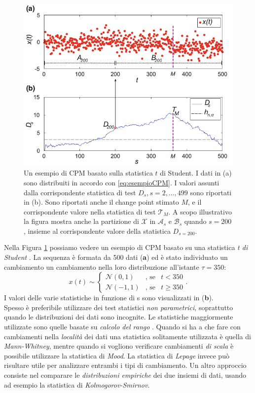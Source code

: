 \begin{figure}[tb]
	\centering
	\includegraphics[width=12cm,keepaspectratio]{pictures/CPM}
	\caption[Esempio di CPM]{Un esempio di CPM basato sulla statistica $t$ di Student. I dati in (a) sono distribuiti in accordo con \eqref{eq:esempioCPM}. I valori assunti dalla corrispondente statistica di test ${D_s,s=2,\dots,499}$ sono riportati in (b). Sono riportati anche il change point stimato $M$, e il corrispondente valore nella statistica di test $\mathcal{T}_M$. A scopo illustrativo la figura mostra anche  la partizione di $\mathcal{X}$ in $\mathcal{A}_s$ e $\mathcal{B}_s$ quando $s=200$, insieme al corrispondente valore della statistica $D_{s=200}$.}
	\label{fig:CPM}
\end{figure}
Nella Figura \ref{fig:CPM} possiamo vedere un esempio di CPM basato su una statistica \textit{t di Student} \cite{alippi2014intelligence}. La sequenza \`e formata da 500 dati (\textbf{a}) ed \`e stato individuato un cambiamento un cambiamento nella loro distribuzione all'istante $\tau=350$:
\begin{equation}
	\label{eq:esempioCPM}
	x(t)\sim \left\{ \begin{array} {lcl}
	\mathcal{N}(0,1) & \mbox{, se} & t< 350 \\
	\mathcal{N}(-1,1) & \mbox{, se} & t\geq 350 \end{array} \right. .
\end{equation} 
I valori delle varie statistiche in funzione di s sono visualizzati in (\textbf{b}).\\
Spesso \`e preferibile utilizzare dei test
statistici \textit{non parametrici},
soprattutto quando le distribuzioni dei dati
sono incognite. Le statistiche maggiormente
utilizzate sono quelle basate su
\textit{calcolo del rango}
\cite{ross2011nonparametric}. Quando si ha a
che fare con cambiamenti nella
\textit{localit\`a} dei dati una statistica
solitamente utilizzata \`e quella di
\textit{Mann-Whitney}, mentre quando si
vogliono verificare cambiamenti \textit{di
	scala} \`e possibile utilizzare la
statistica di \textit{Mood}. La statistica di
\textit{Lepage} invece pu\`o risultare utile
per analizzare entrambi i tipi di
cambiamento. Un altro approccio consiste nel
comparare le \textit{distribuzioni empiriche}
dei due insiemi di dati, usando ad esempio la
statistica di \textit{Kolmogorov-Smirnov}.
